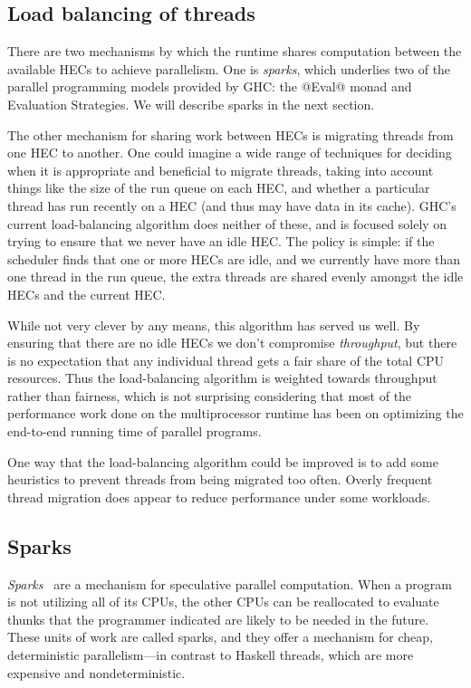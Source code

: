 \subsection{Load balancing of threads}
\label{sec:load-balancing}

There are two mechanisms by which the runtime shares computation
between the available HECs to achieve parallelism.  One is
\emph{sparks}, which underlies two of the parallel programming models
provided by GHC: the @Eval@ monad and Evaluation Strategies.  We will
describe sparks in the next section.

The other mechanism for sharing work between HECs is migrating threads
from one HEC to another.  One could imagine a wide range of techniques
for deciding when it is appropriate and beneficial to migrate threads,
taking into account things like the size of the run queue on each HEC,
and whether a particular thread has run recently on a HEC (and thus
may have data in its cache).  GHC's current load-balancing algorithm
does neither of these, and is focused solely on trying to ensure that
we never have an idle HEC.  The policy is simple: if the scheduler
finds that one or more HECs are idle, and we currently have more than
one thread in the run queue, the extra threads are shared evenly
amongst the idle HECs and the current HEC.

While not very clever by any means, this algorithm has served us well.
By ensuring that there are no idle HECs we don't compromise
\emph{throughput}, but there is no expectation that any individual
thread gets a fair share of the total CPU resources.  Thus the
load-balancing algorithm is weighted towards throughput rather than
fairness, which is not surprising considering that most of the
performance work done on the multiprocessor runtime has been on
optimizing the end-to-end running time of parallel programs.

One way that the load-balancing algorithm could be improved is to add
some heuristics to prevent threads from being migrated too often.
Overly frequent thread migration does appear to reduce performance
under some workloads.

\subsection{Sparks}
\label{sec:sparks}

\emph{Sparks}~\cite{Marlow2009} are a mechanism for speculative parallel computation.
When a program is not utilizing all of its CPUs, the other CPUs can be
reallocated to evaluate thunks that the programmer indicated are likely
to be needed in the future.  These units of work are called sparks, and
they offer a mechanism for cheap, deterministic parallelism---in contrast to
Haskell threads, which are more expensive and nondeterministic.


